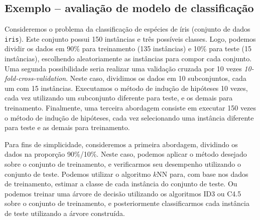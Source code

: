 \subsection{Exemplo -- avaliação de modelo de classificação}

Consideremos o problema da classificação de espécies de íris (conjunto de dados \texttt{iris}). Este conjunto possui 150 instâncias e três possíveis classes. Logo, podemos dividir os dados em 90\% para treinamento (135 instâncias) e 10\% para teste (15 instâncias), escolhendo aleatoriamente as instâncias para compor cada conjunto. Uma segunda possibilidade seria realizar uma validação cruzada por 10 vezes \textit{10-fold-cross-validation}. Neste caso, dividimos os dados em 10 subconjuntos, cada um com 15 instâncias. Executamos o método de indução de hipóteses 10 vezes, cada vez utilizando um subconjunto diferente para teste, e os demais para treinamento. Finalmente, uma terceira abordagem consiste em executar 150 vezes o método de indução de hipóteses, cada vez selecionando uma instância diferente para teste e as demais para treinamento.

Para fins de simplicidade, consideremos a primeira abordagem, dividindo os dados na proporção 90\%/10\%. Neste caso, podemos aplicar o método desejado sobre o conjunto de treinamento, e verificarmos seu desempenho utilizando o conjunto de teste. Podemos utilizar o algoritmo $k$NN para, com base nos dados de treinamento, estimar a classe de cada instância do conjunto de teste. Ou podemos treinar uma árvore de decisão utilizando os algoritmos ID3 ou C4.5 sobre o conjunto de treinamento, e posteriormente classificarmos cada instância de teste utilizando a árvore construída.

